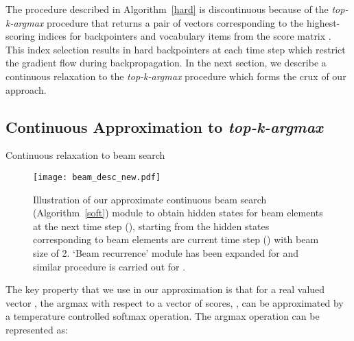 \documentclass[letterpaper]{article} \usepackage{aaai18}  \usepackage{times}  \usepackage{helvet}  \usepackage{courier}  \usepackage{url}  \usepackage{graphicx}  \frenchspacing
\begin{document}
The procedure described in Algorithm~\ref{hard} is discontinuous because of the \textit{top-k-argmax} procedure that returns a pair of vectors corresponding to the  highest-scoring indices for backpointers and vocabulary items from the score matrix . This index selection results in hard backpointers at each time step which restrict the gradient flow during backpropagation.
In the next section, we describe a continuous relaxation to the \textit{top-k-argmax} procedure which forms the crux of our approach.



\subsection{Continuous Approximation to \textit{top-k-argmax} \label{soft-topk}}

\begin{algorithm*}[t]
\caption{Continuous relaxation to beam search}\label{soft}
\begin{algorithmic}[1]
\Initialize{\strut, , , , } 
\ForAll{}
\State  {}
\EndFor
\State  {}
\EndFor
 \State  {}
  \State  {}
  \State  {}
  \State  {}
  \State 
  \State 
\State 
   
  \State 
  \State 
  \EndFor
  \State  {}
 \EndFor
\EndFor
\State  {}
\end{algorithmic}
\end{algorithm*}
\begin{figure*}[t]
\centering
\texttt{[image: beam\_desc\_new.pdf]}
\label{figmodel}
  \caption{Illustration of our approximate continuous beam search (Algorithm~\ref{soft}) module to obtain hidden states for beam elements at the next time step (), starting from the hidden states corresponding to beam elements are current time step () with beam size of 2. `Beam recurrence' module has been expanded for  and similar procedure is carried out for .}
\end{figure*}
The key property that we use in our approximation is that for a real valued vector , the argmax with respect to a vector of scores, , can be approximated by a temperature controlled softmax operation. The argmax operation can be represented as:
\end{document}
